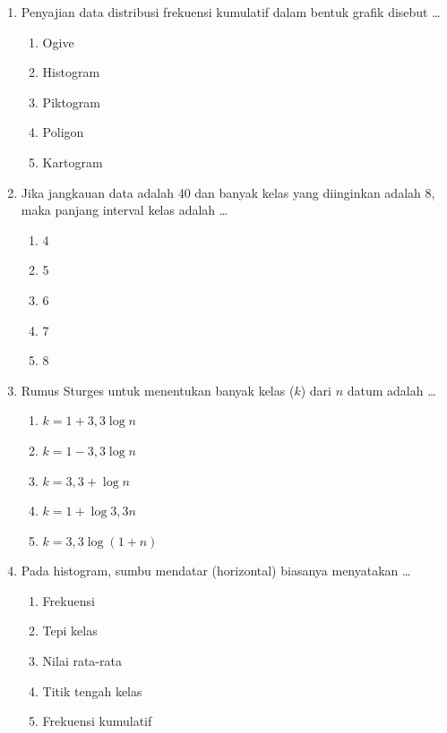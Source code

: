 \documentclass[12pt,a4paper]{article}
\begin{document}
\begin{enumerate}[leftmargin=*]
\item Penyajian data distribusi frekuensi kumulatif dalam bentuk grafik disebut \dots
    \begin{enumerate}[label=\alph*.]
        \item Ogive
        \item Histogram
        \item Piktogram
        \item Poligon
        \item Kartogram
    \end{enumerate}

\item Jika jangkauan data adalah 40 dan banyak kelas yang diinginkan adalah 8, maka panjang interval kelas adalah \dots
    \begin{enumerate}[label=\alph*.]
        \item 4
        \item 5
        \item 6
        \item 7
        \item 8
    \end{enumerate}

\item Rumus Sturges untuk menentukan banyak kelas ($k$) dari $n$ datum adalah \dots
    \begin{enumerate}[label=\alph*.]
        \item $k = 1 + 3,3 \log n$
        \item $k = 1 - 3,3 \log n$
        \item $k = 3,3 + \log n$
        \item $k = 1 + \log 3,3n$
        \item $k = 3,3 \log (1+n)$
    \end{enumerate}

\item Pada histogram, sumbu mendatar (horizontal) biasanya menyatakan \dots
    \begin{enumerate}[label=\alph*.]
        \item Frekuensi
        \item Tepi kelas
        \item Nilai rata-rata
        \item Titik tengah kelas
        \item Frekuensi kumulatif
    \end{enumerate}


\end{enumerate}
\end{document}

